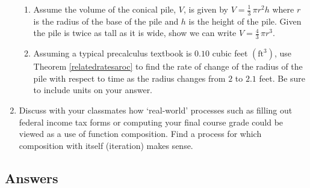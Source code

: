 \documentclass{ximera}
\begin{document}
\begin{enumerate}
\begin{enumerate}

\item  Assume the volume of the conical pile, $V$,  is given by $V = \frac{1}{3} \, \pi r^2 h$ where $r$ is the radius of the base of the pile and $h$ is the height of the pile.  Given the pile is twice as tall as it is wide, show we can write $V = \frac{4}{3} \, \pi r^3$.

\item  Assuming a typical precalculus textbook is $0.10$ cubic feet $\left( \text{ft}^3 \right)$, use Theorem \ref{relatedratesaroc} to find the rate of change of the radius of the pile with respect to time as the radius changes from $2$ to $2.1$ feet. Be sure to include units on your answer.

\end{enumerate}

\item Discuss with your classmates how `real-world' processes such as filling out federal income tax forms or computing your final course grade could be viewed as a use of function composition.  Find a process for which composition with itself (iteration) makes sense.

\end{enumerate}

\newpage

\subsection{Answers}
\end{document}
